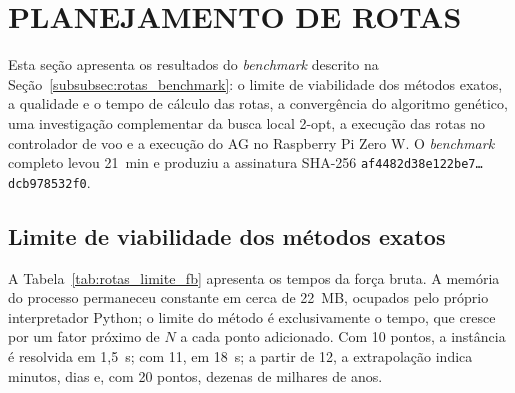 
\section{PLANEJAMENTO DE ROTAS}\label{sec:res_rotas}

Esta seção apresenta os resultados do \textit{benchmark} descrito na Seção~\ref{subsubsec:rotas_benchmark}: o limite de viabilidade dos métodos exatos, a qualidade e o tempo de cálculo das rotas, a convergência do algoritmo genético, uma investigação complementar da busca local 2-opt, a execução das rotas no controlador de voo e a execução do AG no Raspberry Pi Zero W. O \textit{benchmark} completo levou 21~min e produziu a assinatura SHA-256 \texttt{af4482d38e122be7\ldots{}dcb978532f0}.

\subsection{Limite de viabilidade dos métodos exatos}\label{subsec:res_rotas_limite}

A Tabela~\ref{tab:rotas_limite_fb} apresenta os tempos da força bruta. A memória do processo permaneceu constante em cerca de 22~MB, ocupados pelo próprio interpretador Python; o limite do método é exclusivamente o tempo, que cresce por um fator próximo de $N$ a cada ponto adicionado. Com 10 pontos, a instância é resolvida em 1,5~s; com 11, em 18~s; a partir de 12, a extrapolação indica minutos, dias e, com 20 pontos, dezenas de milhares de anos.

